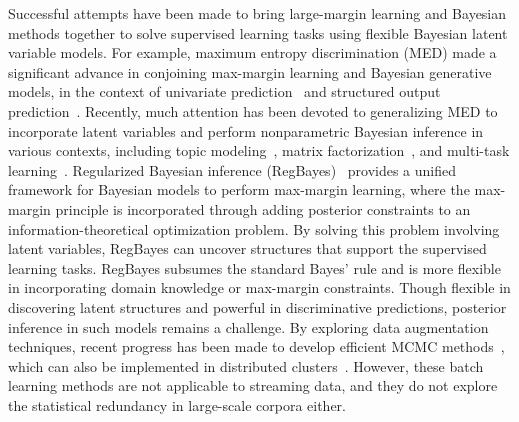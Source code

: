 \documentclass[twoside,11pt]{article}
\begin{document}
Successful attempts have been made to bring large-margin learning and Bayesian methods together to solve supervised learning tasks using flexible Bayesian latent variable models. For example, maximum entropy discrimination (MED) made a significant advance in conjoining max-margin learning and Bayesian generative models, in the context of univariate prediction~\citep{jaakkola1999maximum} and structured output prediction~\citep{Zhu:jmlr09}. Recently, much attention has been devoted to generalizing MED to incorporate latent variables and perform nonparametric Bayesian inference in various contexts, including topic modeling~\citep{zhu2012medlda}, matrix factorization~\citep{xu2013fast}, and multi-task learning~\citep{jebara2011mtl,zhu2013bayesian}. Regularized Bayesian inference (RegBayes)~\citep{zhu2013bayesian} provides a unified framework for Bayesian models to perform max-margin learning, where the max-margin principle is incorporated through adding  posterior constraints to an information-theoretical optimization problem. By solving this problem involving latent variables, RegBayes can uncover structures that support the supervised learning tasks. RegBayes subsumes the standard Bayes' rule and is more flexible in incorporating domain knowledge or max-margin constraints. Though flexible in discovering latent structures and powerful in discriminative predictions, posterior inference in such models remains a challenge. By exploring data augmentation techniques, recent progress has been made to develop efficient MCMC methods~\citep{zhugibbs2013}, which can also be implemented in distributed clusters~\citep{zhu2013scalable}. However, these batch learning methods are not applicable to streaming data, and they do not explore the statistical redundancy in large-scale corpora either. %
\end{document}
